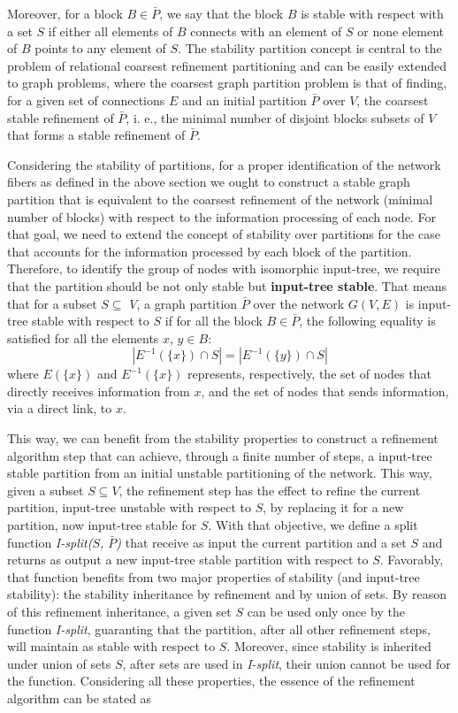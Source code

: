 \documentclass[12pt]{diazessay} %
\begin{document}
Moreover, for a block $B \in \bar{P}$, we say that the block $B$ is stable with respect with a set $S$ if either all elements of $B$ connects with an element of $S$ or none element of $B$ points to any element of $S$. The stability partition concept is central to the problem of relational coarsest refinement partitioning and can be easily extended to graph problems, where the coarsest graph partition problem is that of finding, for a given set of connections $E$ and an initial partition $\bar{P}$ over $V$, the coarsest stable refinement of $\bar{P}$, i. e., the minimal number of disjoint blocks subsets of $V$ that forms a stable refinement of $\bar{P}$. 

Considering the stability of partitions, for a proper identification of the network fibers as defined in the above section we ought to construct a stable graph partition that is equivalent to the coarsest refinement of the network (minimal number of blocks) with respect to the information processing of each node. For that goal, we need to extend the concept of stability over partitions for the case that accounts for the information processed by each block of the partition. Therefore, to identify the group of nodes with isomorphic input-tree, we require that the partition should be not only stable but \textbf{input-tree stable}. That means that for a subset $S \subseteq$ $V$, a graph partition $\bar{P}$ over the network $G(V, E)$ is input-tree stable with respect to $S$ if for all the block $B \in \bar{P}$, the following equality is satisfied for all the elements $x$, $y \in B$:
\begin{equation}
	| E^{-1}(\{x\}) \cap S | = | E^{-1}(\{y\}) \cap S |
\end{equation}
where $E(\{x\})$ and $E^{-1}(\{x\})$ represents, respectively, the set of nodes that directly receives information from $x$, and the set of nodes that sends information, via a direct link, to $x$. 

This way, we can benefit from the stability properties \cite{Tarjan1987} to construct a refinement algorithm step that can achieve, through a finite number of steps, a input-tree stable partition from an initial unstable partitioning of the network. This way, given a subset $S \subseteq V$, the refinement step has the effect to refine the current partition, input-tree unstable with respect to $S$, by replacing it for a new partition, now input-tree stable for $S$. With that objective, we define a split function \textit{I-split($S$, $\bar{P}$)} that receive as input the current partition and a set $S$ and returns as output a new input-tree stable partition with respect to $S$. Favorably, that function benefits from two major properties of stability (and input-tree stability): the stability inheritance by refinement and by union of sets. By reason of this refinement inheritance, a given set $S$ can be used only once by the function \textit{I-split}, guaranting that the partition, after all other refinement steps, will maintain as stable with respect to $S$. Moreover, since stability is inherited under union of sets $S$, after sets are used in \textit{I-split}, their union cannot be used for the function. Considering all these properties, the essence of the refinement algorithm can be stated as
\end{document}
